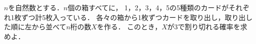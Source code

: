 \documentclass[../../main.tex]{subfiles}
\begin{document}
$n$を自然数とする．$n$個の箱すべてに，
1，2，3，4，5の5種類のカードがそれぞれ1枚ずつ計5枚入っている．
各々の箱から1枚ずつカードを取り出し，取り出した順に左から並べて$n$桁の数$X$を作る．
このとき，$X$が3で割り切れる確率を求めよ．
\end{document}
